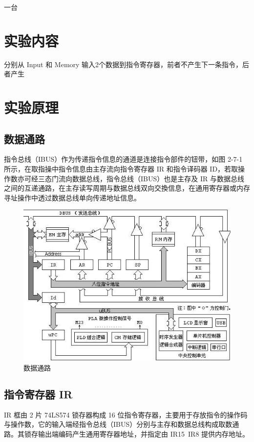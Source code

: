 \documentclass[a4paper,10pt,UTF8]{paper}
\numberwithin{equation}{section}
\numberwithin{figure}{section}
\begin{document}
\dai 一台

\section{实验内容}

分别从 Input 和 Memory 输入2个数据到指令寄存器，前者不产生下一条指令，后者产生

\section{实验原理}

\subsection{数据通路}

指令总线（IBUS）作为传递指令信息的通道是连接指令部件的钮带，如图 2-7-1 所示，在取指操中指令信息由主存流向指令寄存器 IR 和指令译码器 ID，若取操作数亦可经三态门流向数据总线，指令总线（IBUS）也是主存及 IR 与数据总线之间的互递通路，在主存读写周期与数据总线双向交換信息，在通用寄存器或内存寻址操作中透过数据总线单向传递地址信息。

\begin{figure}[h]
  \centering
  \includegraphics[width=0.9\linewidth]{1.jpg}
  \caption{数据通路}
  \label{fig:1}
\end{figure}

\subsection{指令寄存器 IR}

IR 框由 2 片 74LS574 锁存器构成 16 位指令寄存器，主要用于存放指令的操作码与操作数，它的输入端经指令总线（IBUS）分别与主存和数据总线构成取数通路。其锁存输出端编码产生通用寄存器地址，并指定由 IR15~IR8 提供内存地址。
\end{document}
